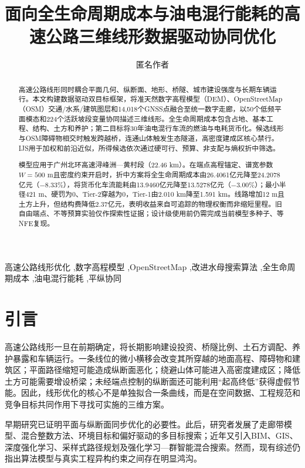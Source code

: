 \documentclass[preprint,12pt]{elsarticle}
\begin{document}
\begin{frontmatter}

\title{面向全生命周期成本与油电混行能耗的高速公路三维线形数据驱动协同优化}

\author[aff1]{匿名作者}

\begin{abstract}
高速公路线形同时耦合平面几何、纵断面、地形、桥隧、城市建设强度与长期车辆运行。本文构建数据驱动双目标框架，将准天然数字高程模型（DEM）、OpenStreetMap（OSM）交通/水系/建筑图层和14,018个GNSS点融合至统一数字走廊，以50个低频平面模态和224个活跃坡段变量协同描述三维线形。全生命周期成本包含占地、基本工程、结构、土方和养护；第二目标将30年油电混行车流的燃油与电耗货币化。候选线形与OSM障碍物相交时触发跨越桥，连通山体触发生态隧道，高密度建成区核心禁行。IJS用于加权和前沿近似，所得候选依次通过硬可行、预算、非支配与熵权折中筛选。

模型应用于广州北环高速浔峰洲—黄村段（22.46 km）。在端点高程锚定、谱宽参数$W=500$ m且密度约束开启时，折中方案将全生命周期成本由26.4061亿元降至24.2078亿元（$-8.33\%$），将货币化车流能耗由13.9460亿元降至13.5278亿元（$-3.00\%$）；最小半径421 m、硬罚为0、Tier-2穿越为0，Tier-1由2.010 km降至1.591 km。线路增加12 m且土方上升，但结构费降低2.37亿元，表明收益来自可追踪的物理权衡而非缩短里程。旧自由端点、不等预算实验仅作探索性证据；设计级使用前仍需完成当前模型多种子、等NFE复现。
\end{abstract}

\begin{keyword}
高速公路线形优化 \sep 数字高程模型 \sep OpenStreetMap \sep 改进水母搜索算法 \sep 全生命周期成本 \sep 油电混行能耗 \sep 平纵协同
\end{keyword}
\end{frontmatter}

\linenumbers

\section{引言}

高速公路线形一旦在前期确定，将长期影响建设投资、桥隧比例、土石方调配、养护暴露和车辆运行。一条线位的微小横移会改变其所穿越的地面高程、障碍物和建筑区；平面路径缩短可能造成纵断面恶化；绕避山体可能进入高密度建成区；降低土方可能需要增设桥梁；未经端点控制的纵断面还可能利用“起高终低”获得虚假节能。因此，线形优化的核心不是单独拟合一条曲线，而是在空间数据、工程规范和竞争目标共同作用下寻找可实施的三维方案。

早期研究已证明平面与纵断面同步优化的必要性\cite{chew1989,jong2003}。此后，研究者发展了走廊带模型、混合整数方法、环境目标和偏好驱动的多目标搜索\cite{kang2012,mondal2015,hirpa2016,vazquez2018,akhmet2022}；近年又引入BIM、GIS、深度强化学习、采样式路径规划及强化学习—群智能混合搜索\cite{han2023,he2023,alhadad2024,pu2024,pu2026}。然而，现有综述仍指出算法模型与真实工程异构约束之间存在明显鸿沟\cite{songreview2023}。
\end{document}
